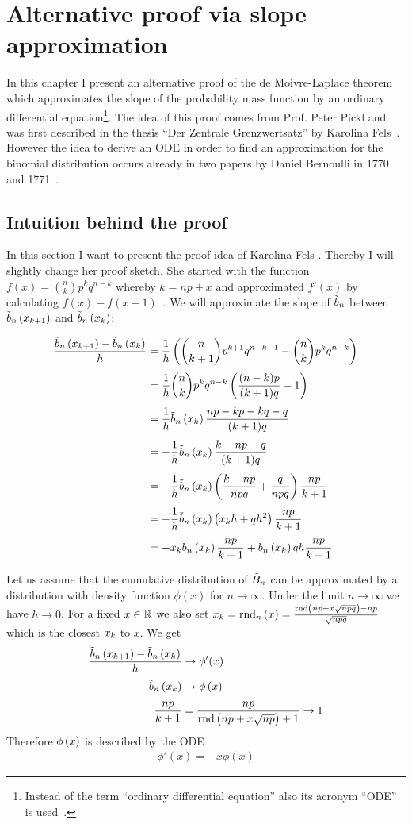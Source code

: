 \chapter{Alternative proof via slope approximation}

In this chapter I present an alternative proof of the de Moivre-Laplace theorem which approximates the slope of the probability mass function by an ordinary differential equation\footnote{Instead of the term ``ordinary differential equation'' also its acronym ``ODE'' is used~\cite[p. 2]{ricardo}\cite{wiki:ode}.}. The idea of this proof comes from Prof. Peter Pickl and was first described in the thesis ``Der Zentrale Grenzwertsatz'' by Karolina Fels~\cite{fels}. However the idea to derive an ODE in order to find an approximation for the binomial distribution occurs already in two papers by Daniel Bernoulli in 1770 and 1771~\cite{hald1}.

\section{Intuition behind the proof}

In this section I want to present the proof idea of Karolina Fels \cite[pp. 16-19]{fels}. Thereby I will slightly change her proof sketch. She started with the function $f(x) = \binom nk p^kq^{n-k}$ whereby $k=np+x$ and approximated $f'(x)$ by calculating $f(x)-f(x-1)$~\cite[p. 16]{fels}. We will approximate the slope of $\bbs$ between $\bb{\x[k+1]}$ and $\bb{\x[k]}$:

\begin{align}
  \frac{\bb{\x[k+1]}-\bb{\x[k]}}h &= \frac 1h \br{\binom n{k+1}p^{k+1}q^{n-k-1} - \binom nk p^k q^{n-k}} \nl
  &= \frac 1h \binom nk p^k q^{n-k} \br{\frac{(n-k)p}{(k+1)q}-1} \nl
  &= \frac 1h \bb{\x[k]} \frac{np-kp-kq-q}{(k+1)q} \nl
  &= - \frac 1h \bb{\x[k]} \frac{k-np+q}{(k+1)q} \nl
  &= - \frac 1h \bb{\x[k]} \br{\frac{k-np}{npq} + \frac{q}{npq}} \frac{np}{k+1} \nl
  &= - \frac 1h \bb{\x[k]} \br{\x[k]h + q h^2} \frac{np}{k+1} \nl
  &= -\x[k] \bb{\x[k]} \frac{np}{k+1} + \bb{\x[k]} q h \frac{np}{k+1}
\end{align}

Let us assume that the cumulative distribution of $\BBs$ can be approximated by a distribution with density function $\phi(x)$ for $n\to\infty$. Under the limit $n\to\infty$ we have $h\to 0$. For a fixed $x\in\R$ we also set $\x = \xrnd{x} = \frac{\rnd{np+ x \sqrt{npq}}-np}{\sqrt{npq}}$ which is the closest $\x$ to $x$. We get
\begin{align}
  \frac{\bb{\x[k+1]}-\bb{\x[k]}}h & \to \phi'(x) \nl
  \bb{\x[k]} &\to \fphi{x} \nl
  \frac{np}{k+1} &= \frac{np}{\rnd{np+x\sqrt{np}}+1} \to 1
\end{align}
Therefore $\fphi{x}$ is described by the ODE
\begin{align}
  \phi'(x) = -x\phi(x)
\end{align}

